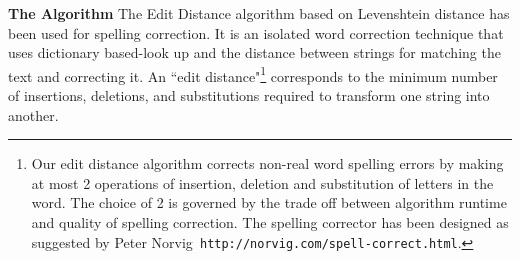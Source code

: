 \documentclass[12pt]{article}
\begin{document}
\textbf{The Algorithm}
\label{spell:algorithm}
The Edit Distance algorithm based on Levenshtein distance\cite{levenshtein1966binary} has been used for spelling correction. It is an isolated word correction technique that uses dictionary based-look up and the distance between strings for matching the text and correcting it. An ``edit distance"\footnote{Our edit distance algorithm corrects non-real word spelling errors by making at most 2 operations of insertion, deletion and substitution of letters in the word. The choice of 2 is governed by the trade off between algorithm runtime and quality of spelling correction. The spelling corrector has been designed as suggested by Peter Norvig\texttt{ http://norvig.com/spell-correct.html}.} corresponds to the minimum number of insertions, deletions, and substitutions required to transform one string into another. %
\end{document}
